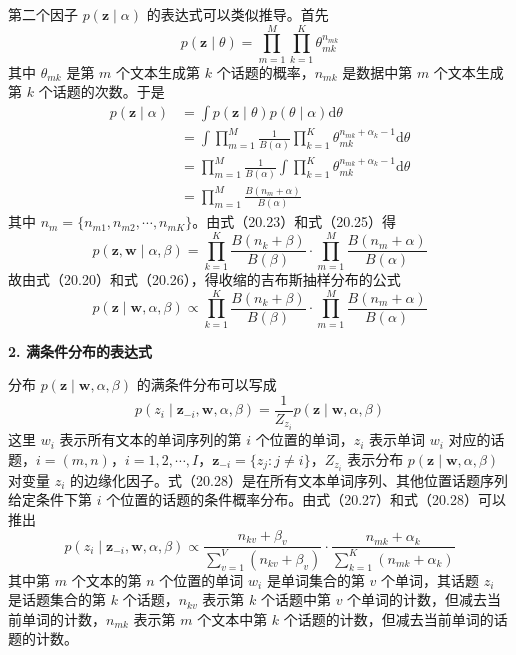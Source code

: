 \documentclass[UTF8,12pt,a4paper,fontset=fandol]{ctexart}
\begin{document}
第二个因子 $p(\mathbf{z}\mid\alpha)$ 的表达式可以类似推导。首先
\begin{equation}
p(\mathbf{z}\mid\theta)=\prod_{m=1}^M\prod_{k=1}^K \theta_{mk}^{n_{mk}}
\tag{20.24}
\end{equation}
其中 $\theta_{mk}$ 是第 $m$ 个文本生成第 $k$ 个话题的概率，$n_{mk}$ 是数据中第 $m$ 个文本生成第 $k$ 个话题的次数。于是
\begin{equation}
\begin{aligned}
p(\mathbf{z}\mid\alpha)
&=\int p(\mathbf{z}\mid\theta)p(\theta\mid\alpha)\mathrm{d}\theta\\
&=\int \prod_{m=1}^M \frac{1}{B(\alpha)}\prod_{k=1}^K \theta_{mk}^{n_{mk}+\alpha_k-1}\mathrm{d}\theta\\
&=\prod_{m=1}^M \frac{1}{B(\alpha)}\int \prod_{k=1}^K \theta_{mk}^{n_{mk}+\alpha_k-1}\mathrm{d}\theta\\
&=\prod_{m=1}^M \frac{B(n_m+\alpha)}{B(\alpha)}
\end{aligned}
\tag{20.25}
\end{equation}
其中 $n_m=\{n_{m1},n_{m2},\cdots,n_{mK}\}$。由式（20.23）和式（20.25）得
\begin{equation}
p(\mathbf{z},\mathbf{w}\mid\alpha,\beta)=\prod_{k=1}^K \frac{B(n_k+\beta)}{B(\beta)}\cdot \prod_{m=1}^M \frac{B(n_m+\alpha)}{B(\alpha)}
\tag{20.26}
\end{equation}
故由式（20.20）和式（20.26），得收缩的吉布斯抽样分布的公式
\begin{equation}
p(\mathbf{z}\mid\mathbf{w},\alpha,\beta)\propto \prod_{k=1}^K \frac{B(n_k+\beta)}{B(\beta)}\cdot \prod_{m=1}^M \frac{B(n_m+\alpha)}{B(\alpha)}
\tag{20.27}
\end{equation}

\noindent\textbf{2. 满条件分布的表达式}

分布 $p(\mathbf{z}\mid\mathbf{w},\alpha,\beta)$ 的满条件分布可以写成
\begin{equation}
p(z_i\mid\mathbf{z}_{-i},\mathbf{w},\alpha,\beta)=\frac{1}{Z_{z_i}}p(\mathbf{z}\mid\mathbf{w},\alpha,\beta)
\tag{20.28}
\end{equation}
这里 $w_i$ 表示所有文本的单词序列的第 $i$ 个位置的单词，$z_i$ 表示单词 $w_i$ 对应的话题，$i=(m,n)$，$i=1,2,\cdots,I$，$\mathbf{z}_{-i}=\{z_j:j\ne i\}$，$Z_{z_i}$ 表示分布 $p(\mathbf{z}\mid\mathbf{w},\alpha,\beta)$ 对变量 $z_i$ 的边缘化因子。式（20.28）是在所有文本单词序列、其他位置话题序列给定条件下第 $i$ 个位置的话题的条件概率分布。由式（20.27）和式（20.28）可以推出
\begin{equation}
p(z_i\mid\mathbf{z}_{-i},\mathbf{w},\alpha,\beta)\propto \frac{n_{kv}+\beta_v}{\sum_{v=1}^V(n_{kv}+\beta_v)}\cdot \frac{n_{mk}+\alpha_k}{\sum_{k=1}^K(n_{mk}+\alpha_k)}
\tag{20.29}
\end{equation}
其中第 $m$ 个文本的第 $n$ 个位置的单词 $w_i$ 是单词集合的第 $v$ 个单词，其话题 $z_i$ 是话题集合的第 $k$ 个话题，$n_{kv}$ 表示第 $k$ 个话题中第 $v$ 个单词的计数，但减去当前单词的计数，$n_{mk}$ 表示第 $m$ 个文本中第 $k$ 个话题的计数，但减去当前单词的话题的计数。
\end{document}
